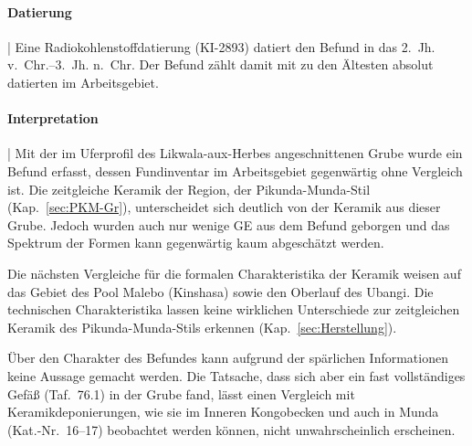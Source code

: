 \paragraph{Datierung}\hspace{-.5em}|\hspace{.5em}%
Eine Radiokohlenstoffdatierung (KI-2893) datiert den Befund in das 2.~Jh. v.~Chr.--3.~Jh. n.~Chr. Der Befund zählt damit mit zu den Ältesten absolut datierten im Arbeitsgebiet.

\paragraph{Interpretation}\hspace{-.5em}|\hspace{.5em}%
Mit der im Uferprofil des \mbox{Likwala}-\mbox{aux}-\mbox{Herbes} angeschnittenen Grube wurde ein Befund erfasst, dessen Fundinventar im Arbeitsgebiet gegenwärtig ohne Vergleich ist. Die zeitgleiche Keramik der Region, der Pikunda-Munda-Stil (Kap.~\ref{sec:PKM-Gr}), unterscheidet sich deutlich von der \mbox{Keramik} aus dieser Grube. Jedoch wurden auch nur wenige GE aus dem Befund geborgen und das Spektrum der Formen kann gegenwärtig kaum abgeschätzt werden. 

Die nächsten Vergleiche für die formalen Charakteristika der Keramik weisen auf das Gebiet des Pool Malebo (Kinshasa) sowie den Oberlauf des \mbox{Ubangi}. Die technischen Charakteristika lassen keine wirklichen Unterschiede zur zeitgleichen Keramik des Pikunda-Munda-Stils erkennen (Kap.~\ref{sec:Herstellung}). 

Über den Charakter des Befundes kann aufgrund der spärlichen Informationen keine Aussage gemacht werden. Die Tatsache, dass sich aber ein fast vollständiges Gefäß (Taf.~76.1) in der Grube fand, lässt einen Vergleich mit Keramikdeponierungen, wie sie im Inneren Kongobecken \parencite{Wotzka.1993} und auch in Munda (Kat.-Nr.~16--17) beobachtet werden können, nicht unwahrscheinlich erscheinen.
